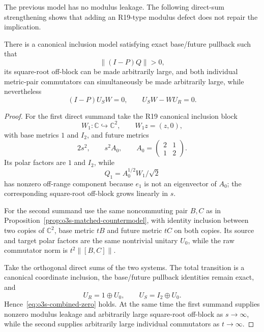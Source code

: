 The previous model has no modulus leakage.  The following direct-sum strengthening
shows that adding an R19-type modulus defect does not repair the implication.

\begin{proposition}
\label{prop:o3s-combined-countermodel}
There is a canonical inclusion model satisfying exact base/future pullback such that
\[
 \|(I-P)Q\|>0,
\]
its square-root off-block can be made arbitrarily large, and both individual metric-pair
commutators can simultaneously be made arbitrarily large, while nevertheless
\[
 \boxed{
 (I-P)U_SW=0,
 \qquad
 U_SW-WU_R=0.
 }
\tag{O3S.7}\label{eq:o3s-combined-zero}
\]
\end{proposition}

\begin{proof}
For the first direct summand take the R19 canonical inclusion block
\[
 W_1:\mathbb C\hookrightarrow\mathbb C^2,
 \qquad W_1z=(z,0),
\]
with base metrics $1$ and $I_2$, and future metrics
\[
 2s^2,
 \qquad
 s^2A_0,
 \qquad
 A_0=\begin{pmatrix}2&1\\1&2\end{pmatrix}.
\]
Its polar factors are $1$ and $I_2$, while
\[
 Q_1=A_0^{1/2}W_1/\sqrt2
\]
has nonzero off-range component because $e_1$ is not an eigenvector of $A_0$; the
corresponding square-root off-block grows linearly in $s$.

For the second summand use the same noncommuting pair $B,C$ as in
Proposition~\ref{prop:o3s-matched-countermodel}, with identity inclusion between two
copies of $\mathbb C^2$, base metric $tB$ and future metric $tC$ on both copies.  Its
source and target polar factors are the same nontrivial unitary $U_0$, while the raw
commutator norm is $t^2\|[B,C]\|$.

Take the orthogonal direct sums of the two systems.  The total transition is a canonical
coordinate inclusion, the base/future pullback identities remain exact, and
\[
 U_R=1\oplus U_0,
 \qquad
 U_S=I_2\oplus U_0.
\]
Hence~\eqref{eq:o3s-combined-zero} holds.  At the same time the first summand supplies
nonzero modulus leakage and arbitrarily large square-root off-block as $s\to\infty$,
while the second supplies arbitrarily large individual commutators as $t\to\infty$.
\end{proof}

